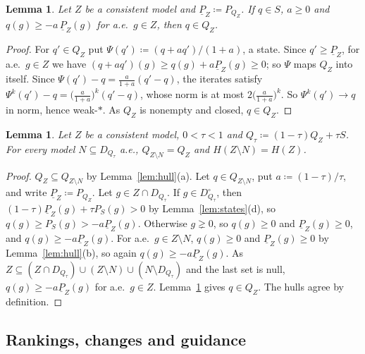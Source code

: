 \documentclass[11pt]{article}
\newtheorem{lemma}[theorem]{Lemma}
\theoremstyle{definition}
\begin{document}
\begin{lemma}\label{lem:contraction}
Let $Z$ be a consistent model and $\underline P_Z\coloneqq P_{Q_Z}$. If $q\in S$, $a\ge0$ and $q(g)\ge-a\,\underline P_Z(g)$ for a.e.\ $g\in Z$, then $q\in Q_Z$.
\end{lemma}
\begin{proof}
For $q'\in Q_Z$ put $\Psi(q')\coloneqq(q+aq')/(1+a)$, a state. Since $q'\ge\underline P_Z$, for a.e.\ $g\in Z$ we have $(q+aq')(g)\ge q(g)+a\underline P_Z(g)\ge0$; so $\Psi$ maps $Q_Z$ into itself. Since $\Psi(q')-q=\frac a{1+a}(q'-q)$, the iterates satisfy $\Psi^k(q')-q=\bigl(\frac a{1+a}\bigr)^k(q'-q)$, whose norm is at most $2\bigl(\frac a{1+a}\bigr)^k$. So $\Psi^k(q')\to q$ in norm, hence weak-$\ast$. As $Q_Z$ is nonempty and closed, $q\in Q_Z$.
\end{proof}

\begin{lemma}\label{lem:trim}
Let $Z$ be a consistent model, $0<\tau<1$ and $Q_\tau\coloneqq(1-\tau)Q_Z+\tau S$. For every model $N\subseteq D_{Q_\tau}$ a.e., $Q_{Z\setminus N}=Q_Z$ and $H(Z\setminus N)=H(Z)$.
\end{lemma}
\begin{proof}
$Q_Z\subseteq Q_{Z\setminus N}$ by Lemma~\ref{lem:hull}(a). Let $q\in Q_{Z\setminus N}$, put $a\coloneqq(1-\tau)/\tau$, and write $\underline P_Z\coloneqq P_{Q_Z}$. Let $g\in Z\cap D_{Q_\tau}$. If $g\in D^\circ_{Q_\tau}$, then $(1-\tau)\underline P_Z(g)+\tau P_S(g)>0$ by Lemma~\ref{lem:states}(d), so $q(g)\ge P_S(g)>-a\underline P_Z(g)$. Otherwise $g\gneq0$, so $q(g)\ge0$ and $\underline P_Z(g)\ge0$, and $q(g)\ge-a\underline P_Z(g)$. For a.e.\ $g\in Z\setminus N$, $q(g)\ge0$ and $\underline P_Z(g)\ge0$ by Lemma~\ref{lem:hull}(b), so again $q(g)\ge-a\underline P_Z(g)$. As $Z\subseteq(Z\cap D_{Q_\tau})\cup(Z\setminus N)\cup(N\setminus D_{Q_\tau})$ and the last set is null, $q(g)\ge-a\underline P_Z(g)$ for a.e.\ $g\in Z$. Lemma~\ref{lem:contraction} gives $q\in Q_Z$. The hulls agree by definition.
\end{proof}

\subsection{Rankings, changes and guidance}
\end{document}
